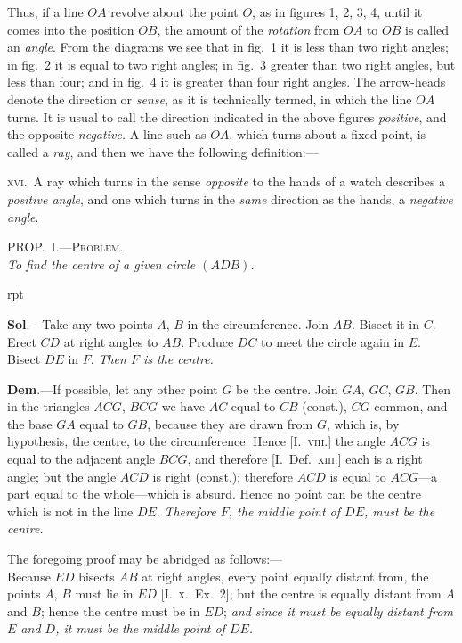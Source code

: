 \documentclass[oneside]{book}
\newcommand\myprop[2]{
\bigskip\Needspace*{4\baselineskip}\begin{center}\textsc{#1}\\\medskip\emph{#2}\par\end{center}
}
\newcommand\imgflow[3]{
\setcounter{wrapwidth}{#1}
\begin{wrapfigure}[#2]{r}{\value{wrapwidth}pt}
\begin{center}
\vspace{-0.3in}
\end{center}
\end{wrapfigure}
}
\newcommand\imgcent[2]{
\begin{center}
\end{center}
}
\begin{document}
\imgcent{308}{f103}

Thus, if a line $OA$ revolve about the point $O$, as in
figures 1, 2, 3, 4, until it comes into the position $OB$,
the amount of the \emph{rotation} from $OA$ to $OB$ is called an
\emph{angle}. From the diagrams we see that in fig.~1 it is
less than two right angles; in fig.~2 it is equal to two
right angles; in fig.~3 greater than two right angles,
but less than four; and in fig.~4 it is greater than four
right angles. The arrow-heads denote the direction or
\emph{sense}, as it is technically termed, in which the line $OA$
turns. It is usual to call the direction indicated in the
above figures \emph{positive}, and the opposite \emph{negative.} A line
such as $OA$, which turns about a fixed point, is called
a \emph{ray}, and then we have the following definition:---

\textsc{xvi}.\ A ray which turns in the sense \emph{opposite} to the
hands of a watch describes a \emph{positive angle}, and one
which turns in the \emph{same} direction as the hands, a
\emph{negative angle}.

\myprop{PROP\@.~I.---Problem.}{To find the centre of a given circle $(ADB)$.}

\imgflow{103}{9}{f104}

\textbf{Sol}.---Take any two points $A$, $B$ in the circumference.
Join $AB$. Bisect it in $C$. Erect
$CD$ at right angles to $AB$. Produce
$DC$ to meet the circle again in $E$.
Bisect $DE$ in $F$. \emph{Then $F$ is the
centre.}

\textbf{Dem}.---If possible, let any other
point $G$ be the centre. Join $GA$,
$GC$, $GB$. Then in the triangles
$ACG$, $BCG$ we have $AC$ equal to
$CB$ (const.), $CG$ common, and the
base $GA$ equal to $GB$, because they are drawn from $G$,
which is, by hypothesis, the centre, to the circumference.
Hence [I.\ \textsc{viii}.] the angle $ACG$ is equal to
the adjacent angle $BCG$, and therefore [I.\ Def.\ \textsc{xiii}.]
each is a right angle; but the angle $ACD$ is right
(const.); therefore $ACD$ is equal to $ACG$---a part equal
to the whole---which is absurd. Hence no point can
be the centre which is not in the line $DE$. \emph{Therefore $F$,
the middle point of $DE$, must be the centre.}

The foregoing proof may be abridged as follows:---\\
Because $ED$ bisects $AB$ at right angles, every point
equally distant from, the points $A$, $B$ must lie in $ED$
[I.\ \textsc{x.}\ Ex.\ 2]; but the centre is equally distant from
$A$ and $B$; hence the centre must be in $ED$; \emph{and since
it must be equally distant from $E$ and $D$, it must be the
middle point of $DE$.}
\end{document}
